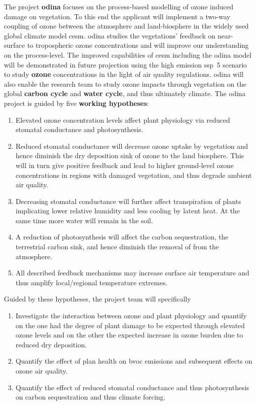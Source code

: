 The project \textbf{\gls{odina}} focuses on the process-based modelling of ozone induced damage on vegetation. To this end the applicant will implement a two-way coupling of ozone between the atmosphere and land-biosphere in the widely used global climate model \gls{cesm}. \gls{odina} studies the vegetations' feedback on near-surface to tropospheric ozone concentrations and will improve our understanding on the process-level. The improved capabilities of \gls{cesm} including the \gls{odina} model will be demonstrated in future projection using the high emission \gls{ssp}~5 scenario to study \textbf{\color{red}ozone} concentrations in the light of air quality regulations. \gls{odina} will also enable the research team to study ozone impacts through vegetation on the global \textbf{\color{darkgray}carbon cycle} and \textbf{\color{blue}water cycle}, and thus ultimately climate.
The \gls{odina} project is guided by five \textbf{working hypotheses}: 

\begin{enumerate}
\itemsep0pt
\item Elevated ozone concentration levels affect plant physiology via reduced stomatal conductance and photosynthesis. 
\item Reduced stomatal conductance will decrease ozone uptake by vegetation and hence diminish the dry deposition sink of ozone to the land biosphere. This will in turn give  positive feedback and lead to higher ground-level ozone concentrations in regions with damaged vegetation, and thus degrade ambient air quality.
\item Decreasing stomatal conductance will further affect transpiration of plants implicating lower relative humidity and less cooling by latent heat. At the same time more water will remain in the soil.
\item A reduction of photosynthesis will affect the carbon sequestration, the terrestrial carbon sink, and hence diminish the removal of  from the atmosphere.
\item All described feedback mechanisms may increase surface air temperature and thus amplify local/regional temperature extremes.
\end{enumerate}

Guided by these hypotheses, the project team will specifically
\begin{enumerate}
\itemsep0pt
\item Investigate the interaction between ozone and plant physiology and quantify on the one had the degree of plant damage to be expected through elevated ozone levels and on the other the expected increase in ozone burden due to reduced dry deposition.
\item Quantify the effect of plan health on \gls{bvoc} emissions and subsequent effects on ozone air quality.  
\item Quantify the effect of reduced stomatal conductance and thus photosynthesis on carbon sequestration and thus climate forcing.
\end{enumerate}

